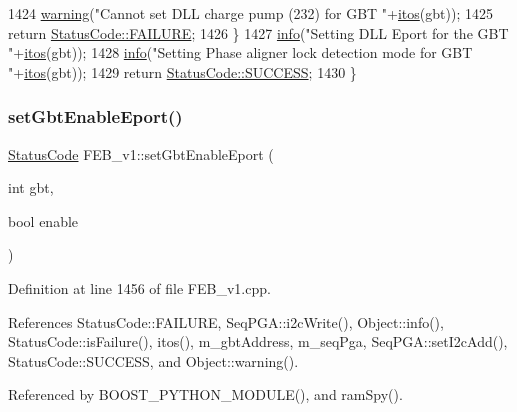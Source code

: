 \begin{DoxyCode}
1424     \hyperlink{classObject_a65cd4fda577711660821fd2cd5a3b4c9}{warning}(\textcolor{stringliteral}{"Cannot set DLL charge pump (232) for GBT "}+\hyperlink{Tools_8h_af330027dbdafb9a30768b3613c553e60}{itos}(gbt));
1425     \textcolor{keywordflow}{return} \hyperlink{classStatusCode_a6f565cbeadc76d14c72f047e5e85eb4ba3da73d4c469762eb9d3c960368252b26}{StatusCode::FAILURE};
1426   \}
1427   \hyperlink{classObject_a644fd329ea4cb85f54fa6846484b84a8}{info}(\textcolor{stringliteral}{"Setting DLL Eport for the GBT "}+\hyperlink{Tools_8h_af330027dbdafb9a30768b3613c553e60}{itos}(gbt));
1428   \hyperlink{classObject_a644fd329ea4cb85f54fa6846484b84a8}{info}(\textcolor{stringliteral}{"Setting Phase aligner lock detection mode for GBT "}+\hyperlink{Tools_8h_af330027dbdafb9a30768b3613c553e60}{itos}(gbt));
1429   \textcolor{keywordflow}{return} \hyperlink{classStatusCode_a6f565cbeadc76d14c72f047e5e85eb4badd0da38d3ba0d922efd1f4619bc37ad8}{StatusCode::SUCCESS};
1430 \}
\end{DoxyCode}
\mbox{\label{classFEB__v1_a30ce0e679748a4e2bf7f953b2162618f}} 
\subsubsection{\texorpdfstring{set\+Gbt\+Enable\+Eport()}{setGbtEnableEport()}}
{\footnotesize\ttfamily \hyperlink{classStatusCode}{Status\+Code} F\+E\+B\+\_\+v1\+::set\+Gbt\+Enable\+Eport (\begin{DoxyParamCaption}\item[{int}]{gbt,  }\item[{bool}]{enable }\end{DoxyParamCaption})}



Definition at line 1456 of file F\+E\+B\+\_\+v1.\+cpp.



References Status\+Code\+::\+F\+A\+I\+L\+U\+RE, Seq\+P\+G\+A\+::i2c\+Write(), Object\+::info(), Status\+Code\+::is\+Failure(), itos(), m\+\_\+gbt\+Address, m\+\_\+seq\+Pga, Seq\+P\+G\+A\+::set\+I2c\+Add(), Status\+Code\+::\+S\+U\+C\+C\+E\+SS, and Object\+::warning().



Referenced by B\+O\+O\+S\+T\+\_\+\+P\+Y\+T\+H\+O\+N\+\_\+\+M\+O\+D\+U\+L\+E(), and ram\+Spy().


